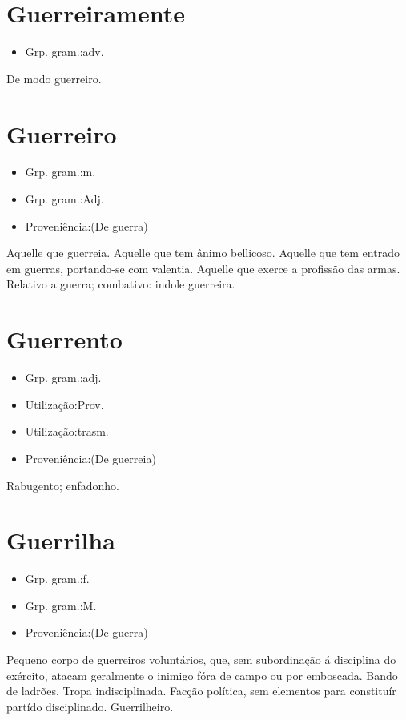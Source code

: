 \section{Guerreiramente}
\begin{itemize}
\item {Grp. gram.:adv.}
\end{itemize}
De modo guerreiro.
\section{Guerreiro}
\begin{itemize}
\item {Grp. gram.:m.}
\end{itemize}
\begin{itemize}
\item {Grp. gram.:Adj.}
\end{itemize}
\begin{itemize}
\item {Proveniência:(De \textunderscore guerra\textunderscore )}
\end{itemize}
Aquelle que guerreia.
Aquelle que tem ânimo bellicoso.
Aquelle que tem entrado em guerras, portando-se com valentia.
Aquelle que exerce a profissão das armas.
Relativo a guerra; combativo: \textunderscore indole guerreira\textunderscore .
\section{Guerrento}
\begin{itemize}
\item {Grp. gram.:adj.}
\end{itemize}
\begin{itemize}
\item {Utilização:Prov.}
\end{itemize}
\begin{itemize}
\item {Utilização:trasm.}
\end{itemize}
\begin{itemize}
\item {Proveniência:(De \textunderscore guerreia\textunderscore )}
\end{itemize}
Rabugento; enfadonho.
\section{Guerrilha}
\begin{itemize}
\item {Grp. gram.:f.}
\end{itemize}
\begin{itemize}
\item {Grp. gram.:M.}
\end{itemize}
\begin{itemize}
\item {Proveniência:(De \textunderscore guerra\textunderscore )}
\end{itemize}
Pequeno corpo de guerreiros voluntários, que, sem subordinação á disciplina do exército, atacam geralmente o inimigo fóra de campo ou por emboscada.
Bando de ladrões.
Tropa indisciplinada.
Facção política, sem elementos para constituír partído disciplinado.
Guerrilheiro.
